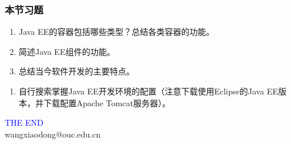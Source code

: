 \begin{frame}
  \frametitle{本节习题}

  
  \begin{enumerate}
  \item Java EE的容器包括哪些类型？总结各类容器的功能。
  \item 简述Java EE组件的功能。
  \item 总结当今软件开发的主要特点。
  \end{enumerate}

  \begin{enumerate}
  \item 自行搜索掌握Java EE开发环境的配置（注意下载使用Eclipse的Java EE版本，并下载配置Apache Tomcat服务器）。
  \end{enumerate}
\end{frame}

\begin{frame}
\centering
{\Huge \textcolor{blue}{THE END}} \\
\vspace{5mm}
{\Large wangxiaodong@ouc.edu.cn} \\
\end{frame}

